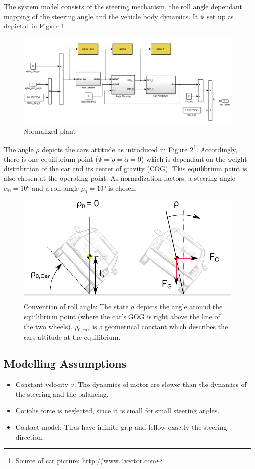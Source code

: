\documentclass[conference]{IEEEtran}
\begin{document}
The system model consists of the steering mechanism, the roll angle dependant mapping of the steering angle and the vehicle body dynamics. It is set up as depicted in Figure \ref{figure:P_car}. 

\begin{figure}[h]
\centering
  \includegraphics[width=.47\textwidth]{pics/P_car.png} 
  \caption{Normalized plant}  
  \label{figure:P_car}
\end{figure}

The angle $\rho$ depicts the cars attitude as introduced in Figure \ref{figure:car_from_back}\footnote{Source of car picture: http://www.4vector.com}. Accordingly, there is one equilibrium point ($\dot{\Psi} = \dot{\rho} = \dot{\alpha} = 0$) which is dependant on the weight distribution of the car and its center of gravity (COG). This equilibrium point is also chosen at the operating point. As normalization factors, a steering angle $\alpha_{0}=10°$ and a roll angle $\rho_{0}=10°$ is chosen.

\begin{figure}[h]
\centering
  \includegraphics[width=.47\textwidth]{pics/car_from_back} 
  \caption{Convention of roll angle: The state $\rho$ depicts the angle around the equilibrium point (where the car's GOG is right above the line of the two wheels). $\rho_{0,car}$ is a geometrical constant which describes the cars attitude at the equilibrium.}  
  \label{figure:car_from_back}
\end{figure}



\subsection{Modelling Assumptions}

\begin{itemize}
    \item Constant velocity $v$. The dynamics of motor are slower than the dynamics of the steering and the balancing.
    \item Coriolis force is neglected, since it is small for small steering angles.
    \item Contact model: Tires have infinite grip and follow exactly the steering direction.
\end{itemize}
\end{document}
